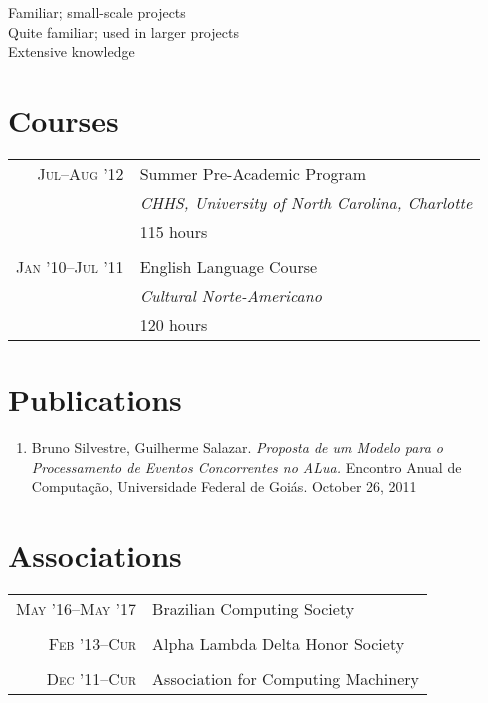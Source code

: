 \documentclass[a4paper,10pt]{article}
\begin{document}
\begin{center}
\parbox[c]{8cm}{
  \onenote Familiar; small-scale projects \\
  \twonotes Quite familiar; used in larger projects \\
  \threenotes Extensive knowledge
}
\end{center}

\section{Courses}

\begin{tabular}{r|p{11cm}}

  \textsc{Jul--Aug '12} & Summer Pre-Academic Program\\ &
  \emph{CHHS, University of North Carolina, Charlotte}\\ & 115 hours
  \\\multicolumn{2}{c}{} \\

  \textsc{Jan '10--Jul '11} & English Language Course\\ &
  \emph{Cultural Norte-Americano} \\ & 120 hours\\

\end{tabular}

\section{Publications}
\begin{enumerate}
  \renewcommand{\labelenumi}{[\arabic{enumi}] }
  \item Bruno Silvestre, Guilherme Salazar. \emph{Proposta de um Modelo para o
        Processamento de Eventos Concorrentes no ALua.} Encontro Anual de
        Computação, Universidade Federal de Goiás. October 26, 2011
\end{enumerate}

\section{Associations}

\begin{tabular}{r|p{11cm}}

  \textsc{May '16--May '17}
  & Brazilian Computing Society\\
  \multicolumn{2}{c}{}\\

  \textsc{Feb '13--Cur}
  & Alpha Lambda Delta Honor Society\\
  \multicolumn{2}{c}{}\\

  \textsc{Dec '11--Cur}
  & Association for Computing Machinery\\

\end{tabular}
\end{document}
